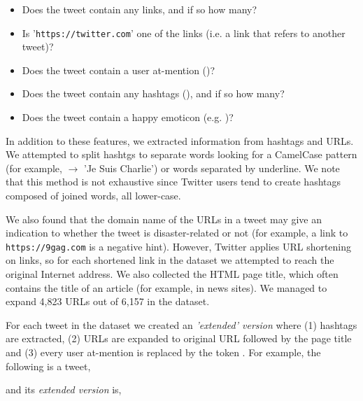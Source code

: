 \documentclass[letterpaper,twocolumn,10pt]{article}
\begin{document}
\begin{itemize}[noitemsep, nolistsep]
	\item Does the tweet contain any links, and if so how many?
	\item Is '\texttt{https://twitter.com}' one of the links (i.e. a link that refers to another tweet)?
	\item Does the tweet contain a user at-mention ()?
	\item Does the tweet contain any hashtags (\tweet{\#}), and if so how many?
	\item Does the tweet contain a happy emoticon (e.g. )?
\end{itemize}

In addition to these features, we extracted information from hashtags and URLs. We attempted to split hashtgs to separate words
looking for a CamelCase pattern (for example,  $\rightarrow$ 'Je Suis Charlie') or words separated by underline. We note that this method is not exhaustive since Twitter users tend to create hashtags composed of joined words, all lower-case.

We also found that the domain name of the URLs in a tweet may give an indication to whether the tweet is disaster-related or not (for example, a link to \texttt{https://9gag.com} is a negative hint). However, Twitter applies URL shortening on links, so for each shortened link in the dataset we attempted to reach the original Internet address. We also collected the HTML page title, which often contains the title of an article (for example, in news sites). We managed to expand 4,823 URLs out of 6,157 in the dataset.

For each tweet in the dataset we created an \textit{'extended' version} where (1) hashtags are extracted, (2) URLs are expanded to original URL followed by the page title and (3) every user at-mention is replaced by the token .
For example, the following is a tweet,

\begin{center}
	\parbox{190pt}{}
\end{center}

and its \textit{extended version} is,

\begin{center}
	\parbox{190pt}{}
\end{center}
\end{document}
